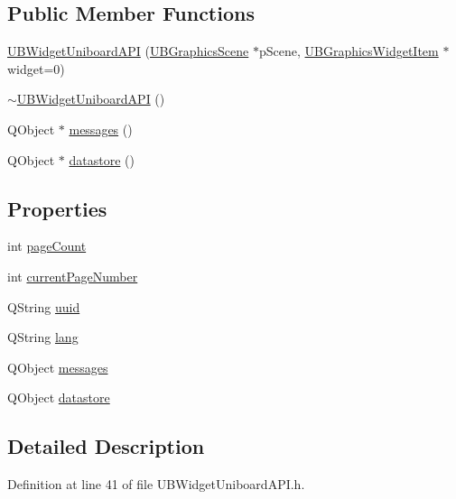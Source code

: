 \subsection*{Public Member Functions}
\begin{DoxyCompactItemize}
\item 
\hyperlink{class_u_b_widget_uniboard_a_p_i_a7710ddebacf2da0dd2cb9c0110527f47}{U\-B\-Widget\-Uniboard\-A\-P\-I} (\hyperlink{class_u_b_graphics_scene}{U\-B\-Graphics\-Scene} $\ast$p\-Scene, \hyperlink{class_u_b_graphics_widget_item}{U\-B\-Graphics\-Widget\-Item} $\ast$widget=0)
\item 
\hyperlink{class_u_b_widget_uniboard_a_p_i_aa7ff7a81d1da33f4d5d130b09bc34287}{$\sim$\-U\-B\-Widget\-Uniboard\-A\-P\-I} ()
\item 
Q\-Object $\ast$ \hyperlink{class_u_b_widget_uniboard_a_p_i_a1c971367d27f8cef5c2ef61daa402beb}{messages} ()
\item 
Q\-Object $\ast$ \hyperlink{class_u_b_widget_uniboard_a_p_i_a45fed0e3d59f3d3e9a438c08ca4e216c}{datastore} ()
\end{DoxyCompactItemize}
\subsection*{Properties}
\begin{DoxyCompactItemize}
\item 
int \hyperlink{class_u_b_widget_uniboard_a_p_i_a497eb60c084a0eb527c13730d5575756}{page\-Count}
\item 
int \hyperlink{class_u_b_widget_uniboard_a_p_i_a43780354b20b4749b16e677c4f014f85}{current\-Page\-Number}
\item 
Q\-String \hyperlink{class_u_b_widget_uniboard_a_p_i_a1d94cb1a20327d9b7f84432d6098e939}{uuid}
\item 
Q\-String \hyperlink{class_u_b_widget_uniboard_a_p_i_a8a34f433ea5b41c7fc8e3e3dc7b0b261}{lang}
\item 
Q\-Object \hyperlink{class_u_b_widget_uniboard_a_p_i_af8192ae436ee2f79a49bac901f877e89}{messages}
\item 
Q\-Object \hyperlink{class_u_b_widget_uniboard_a_p_i_a9797b142d1083de75b88ec5e5d3368a4}{datastore}
\end{DoxyCompactItemize}


\subsection{Detailed Description}


Definition at line 41 of file U\-B\-Widget\-Uniboard\-A\-P\-I.\-h.



